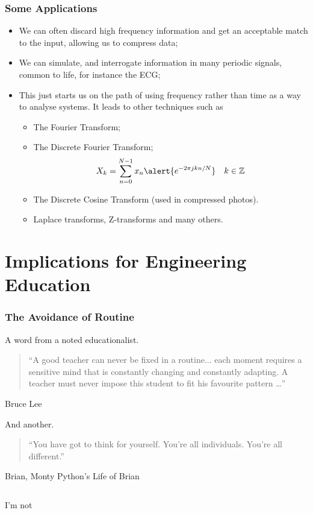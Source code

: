 \documentclass{beamer}
\begin{document}
\begin{frame}
  \frametitle{Some Applications}
  
  \begin{itemize}
  	\item We can often discard high frequency information and get an acceptable match to the input, allowing us to compress data;
  	\item We can simulate, and interrogate information in many periodic signals, common to life, for instance the ECG;
  	\item This just starts us on the path of using \alert{frequency} rather than \alert{time} as a way to analyse systems. It leads to other techniques such as
  	\begin{itemize}
  	\item The Fourier Transform;
  	\item The Discrete Fourier Transform;
  	\[
  	X_k = \sum_{n=0}^{N-1} x_n \alert{e^{-2 \pi j k n / N}} \quad k \in \mathbb{Z}
  	\]
  	\item The Discrete Cosine Transform (used in compressed photos).
  	\item Laplace transforms, Z-transforms and many others.  	
  	\end{itemize}  
  \end{itemize}
\end{frame}


\section{Implications for Engineering Education}


\begin{frame}
  \frametitle{The Avoidance of Routine}

\begin{block}{A word from a noted educationalist.}
\begin{quote}“A good teacher can never be fixed in a routine... each moment requires a sensitive mind that is constantly changing and constantly adapting. A teacher must never impose this student to fit his favourite pattern \ldots''
\end{quote}
\end{block}
\pause
\hfill Bruce Lee
\pause

\begin{block}{And another.}
\begin{quote}“You have got to think for yourself. You're all individuals. You're all different.”
\end{quote}
\end{block}
\hfill Brian, Monty Python's Life of Brian

\pause
\begin{columns}
\column{8.5 cm}
\column{1.5 cm}
\begin{block}{}
I'm not
\end{block}
\end{columns}
\end{frame}
\end{document}

